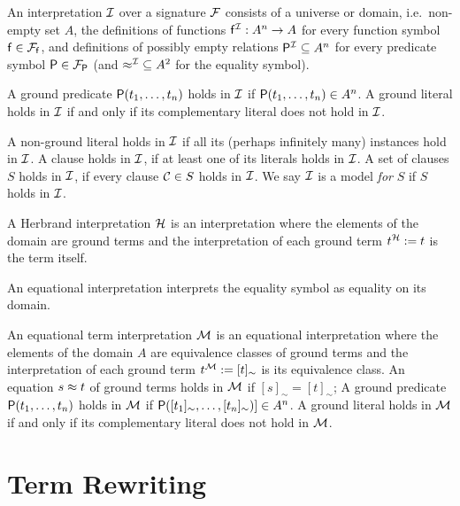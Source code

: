 \begin{definition}
	An {\myem interpretation} ${\mathcal I}$ over a signature ${\mathcal F}$ consists 
	of a {\myem universe} or {\myem domain}, i.e.~non-empty set  $A$,
	the definitions of functions ${\mathsf f}^{\mathcal I}: A^n\rightarrow A$  for every function symbol ${\mathsf f}\in{{\mathcal F}_{\mathsf f}}$, 
	and definitions of possibly empty relations 
	 ${{\mathsf P}^{\mathcal I}}\subseteq A^n$ for every predicate symbol ${\mathsf P}\in{{\mathcal F}_{\mathsf P}}$
	 (and ${\approx^{\mathcal I}}\subseteq A^2$ for the equality symbol).
	
	A ground predicate ${\mathsf P}(t_1,\ldots,t_n)$ holds in ${\mathcal I}$ if ${\mathsf P}(t_1,\ldots,t_n) \in A^n$.
	A ground literal holds in ${\mathcal I}$ if and only if its complementary literal does not hold in ${\mathcal I}$.
	
	A non-ground literal holds in ${\mathcal I}$ if all its 
	(perhaps infinitely many)
	instances hold in ${\mathcal I}$.
	A clause holds in ${\mathcal I}$, if at least one of its literals holds in ${\mathcal I}$.
	A set of clauses $S$ holds in ${\mathcal I}$, if every clause ${\mathcal C}\in S$ holds in ${\mathcal I}$.
	We say ${\mathcal I}$ is a model {\em for} $S$ if $S$ holds in ${\mathcal I}$. 
\end{definition}

\begin{definition}\label{def:termmodel}
	A {\myem Herbrand interpretation}  ${\mathcal H}$ is an interpretation where the elements of the domain are ground terms
	and the interpretation of each ground term $t^{\mathcal H} := t$ is the term itself.
\end{definition}

\begin{definition}
	An {\myem equational} interpretation interprets the equality symbol as equality on its domain.
\end{definition}

\begin{definition}
	An {\myem equational term interpretation} ${\mathcal M}$ is an equational interpretation 
	where the elements of the domain $A$ 
		are equivalence classes of ground terms
		and the interpretation of each ground term $t^{\mathcal M} := [t]_\sim$ is its equivalence class.
		An equation $s\approx t$ of ground terms holds in ${\mathcal M}$ if $[s]_\sim=[t]_\sim$;
	A ground predicate ${\mathsf P}(t_1,\ldots,t_n)$ holds in ${\mathcal M}$ if ${\mathsf P}([t_1]_\sim,\ldots,[t_n]_\sim)] \in A^n$.
	A ground literal holds in ${\mathcal M}$ if and only if its complementary literal does not hold in ${\mathcal M}$.
	
\end{definition}

\section{Term Rewriting}




